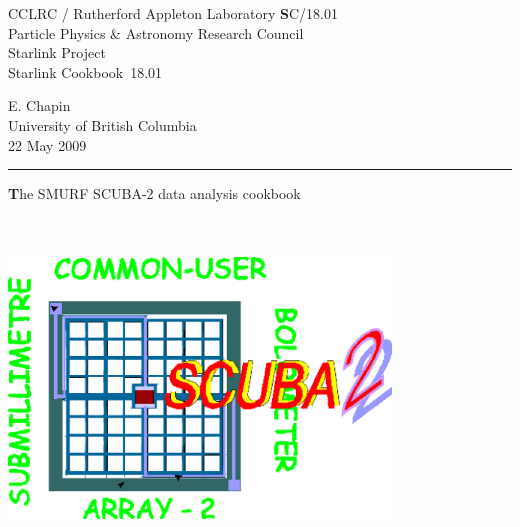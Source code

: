 \documentclass[twoside,11pt]{article}
\newcommand{\stardoccategory}  {Starlink Cookbook}
\newcommand{\stardocinitials}  {SC}
\newcommand{\stardocnumber}    {18.01}
\newcommand{\stardocauthors}   {E. Chapin \\ 
University of British Columbia}
\newcommand{\stardocdate}      {22 May 2009}
\newcommand{\stardoctitle}     {The SMURF SCUBA-2 data analysis cookbook}
\newcommand{\stardocversion}   {\ }
\newcommand{\stardocmanual}    {\ }
\newcommand{\stardocname}{\stardocinitials /\stardocnumber}
\newenvironment{latexonly}{}{}
\renewcommand{\_}{\texttt{\symbol{95}}}
\begin{document}
\thispagestyle{empty}

\begin{latexonly}
   CCLRC / {\textsc Rutherford Appleton Laboratory} \hfill {\textbf 
\stardocname}\\
   {\large Particle Physics \& Astronomy Research Council}\\
   {\large Starlink Project\\}
   {\large \stardoccategory\ \stardocnumber}
   \begin{flushright}
   \stardocauthors\\
   \stardocdate
   \end{flushright}
   \vspace{-4mm}
   \rule{\textwidth}{0.5mm}
   \vspace{5mm}
   \begin{center}
   {\Huge\textbf  \stardoctitle \\ [2.5ex]}
   {\LARGE\textbf \stardocversion \\ [4ex]}
   {\Huge\textbf  \stardocmanual}
   \end{center}

\begin{center}
\hspace{1.3in}\includegraphics[width=4.0in]{sc18_logo.eps}
\end{center}

\end{latexonly}
\end{document}
